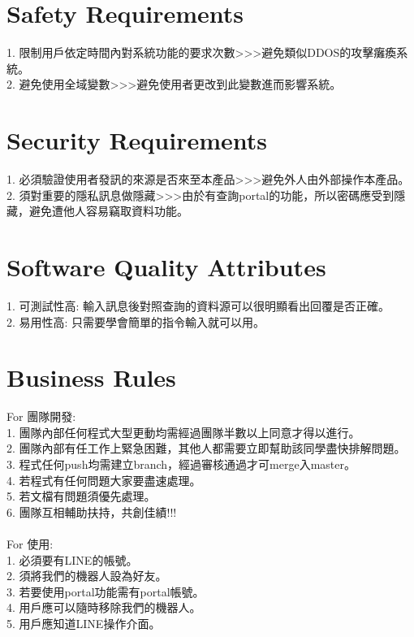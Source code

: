 \documentclass{scrreprt}
\begin{document}
\begin{CJK}{UTF8}{bkai}
\section{Safety Requirements}
1.  限制用戶依定時間內對系統功能的要求次數>>>避免類似DDOS的攻擊癱瘓系統。\\
2.  避免使用全域變數>>>避免使用者更改到此變數進而影響系統。\\

\section{Security Requirements}
1.  必須驗證使用者發訊的來源是否來至本產品>>>避免外人由外部操作本產品。\\
2.  須對重要的隱私訊息做隱藏>>>由於有查詢portal的功能，所以密碼應受到隱藏，避免遭他人容易竊取資料功能。\\

\section{Software Quality Attributes}
1.  可測試性高: 輸入訊息後對照查詢的資料源可以很明顯看出回覆是否正確。\\
2.  易用性高: 只需要學會簡單的指令輸入就可以用。\\

\section{Business Rules}
For 團隊開發:\\
1.  團隊內部任何程式大型更動均需經過團隊半數以上同意才得以進行。\\
2.  團隊內部有任工作上緊急困難，其他人都需要立即幫助該同學盡快排解問題。\\
3.  程式任何push均需建立branch，經過審核通過才可merge入master。\\
4.  若程式有任何問題大家要盡速處理。\\
5.  若文檔有問題須優先處理。\\
6.  團隊互相輔助扶持，共創佳績!!!\\\\
For 使用:\\
1.  必須要有LINE的帳號。\\
2.  須將我們的機器人設為好友。\\
3.  若要使用portal功能需有portal帳號。\\
4.  用戶應可以隨時移除我們的機器人。\\
5.  用戶應知道LINE操作介面。\\


\end{CJK}
\end{document}
